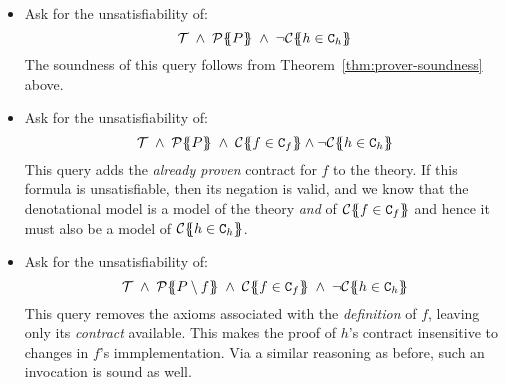 \begin{itemize}
  \item Ask for the unsatisfiability of: 
    \[  \Th\; \land \; \ptrans{\Sigma}{P} \; \land \;\neg\ctrans{\Sigma}{P}{h \in \Ct_h} \]
        The soundness of this query follows from Theorem~\ref{thm:prover-soundness} above.

  \item Ask for the unsatisfiability of:
    \[  \Th \; \land\; \ptrans{\Sigma}{P} \; \land \; \ctrans{\Sigma}{P}{f \in \Ct_f} \land \neg \ctrans{\Sigma}{P}{h \in \Ct_h} \]
        This query adds the {\em already proven} contract for $f$ to the theory. If this formula
        is unsatisfiable, then its negation is valid, and we know that the denotational model is 
        a model of the theory {\em and} of $\ctrans{\Sigma}{P}{f \in \Ct_f}$ and hence it must also
        be a model of $\ctrans{\Sigma}{P}{h \in \Ct_h}$.
  \item Ask for the unsatisfiability of:
    \[  \Th \; \land \; 
        \ptrans{\Sigma}{P \setminus f} \; \land \; 
        \ctrans{\Sigma}{P}{f \in \Ct_f} \; \land \;
        \neg\ctrans{\Sigma}{P}{h \in \Ct_h} \]
        This query removes the axioms associated with the \emph{definition} of $f$, leaving
        only its \emph{contract} available.  This makes the proof of $h$'s contract
        insensitive to changes in $f$'s immplementation.
        Via a similar reasoning as before, such an invocation 
        is sound as well.
\end{itemize}



